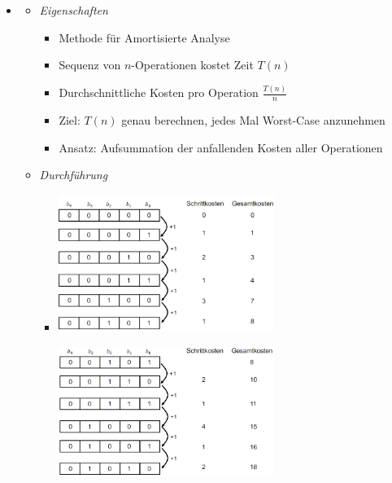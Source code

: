 \documentclass[
    12pt,
    a4paper,
    ngerman,
    color=3b,%
    marginpar=false,
    colorback=false,
    leqno,
]{tudaexercise}
\begin{document}
\begin{itemize}
        \item {}
            \begin{itemize}
                \item \textit{Eigenschaften}
                    \begin{itemize}
                        \item Methode für Amortisierte Analyse
                        \item Sequenz von $n$-Operationen kostet Zeit $T(n)$
                        \item Durchschnittliche Kosten pro Operation $\frac{T(n)}{n}$
                        \item Ziel: $T(n)$ genau berechnen,  jedes Mal Worst-Case anzunehmen
                        \item Ansatz: Aufsummation der  anfallenden Kosten aller Operationen
                    \end{itemize}
                \item \textit{Durchführung}
                    \begin{itemize}
                        \item[]
                            \begin{minipage}{0.4\textwidth}
                                \includegraphics[width=7cm]{pictures/aggregat1.PNG}
                            \end{minipage}
                            \begin{minipage}{0.5\textwidth}
                                \includegraphics[width=7cm]{pictures/aggregat2.PNG}

\end{minipage}
\end{itemize}
\end{itemize}
\end{itemize}
\end{document}
